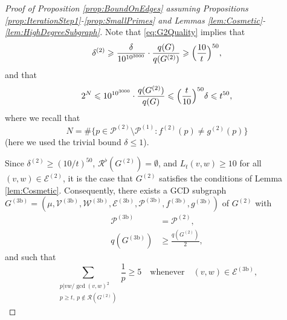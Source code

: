 \documentclass[12pt]{amsart}
\numberwithin{equation}{section}
\theoremstyle{definition}
\theoremstyle{remark}
\newcommand{\CE}{\mathcal{E}}
\newcommand{\CP}{\mathcal{P}}
\newcommand{\CR}{\mathcal{R}}
\newcommand{\CV}{\mathcal{V}}
\newcommand{\CW}{\mathcal{W}}
\newcommand{\eq}[1]{ \begin{equation} \begin{split} #1 \end{split} \end{equation} }
\renewcommand{\le}{\leqslant}
\renewcommand{\ge}{\geqslant}
\begin{document}
\begin{proof}[Proof of Proposition \ref{prop:BoundOnEdges} assuming Propositions \ref{prop:IterationStep1}-\ref{prop:SmallPrimes} and Lemmas \ref{lem:Cosmetic}-\ref{lem:HighDegreeSubgraph}]
\medskip

Note that \eqref{eq:G2Quality} implies that
\[
\delta^{(2)}\ge\frac{\delta}{10^{10^{3000}}} \cdot \frac {q(G)}{q(G^{(2)})}\ge \Bigl(\frac{10}{t}\Bigr)^{50},
\]
and that 
\eq{\label{eq:N-bound}
2^N\le 10^{10^{3000}} \cdot \frac{q(G^{(2)})}{q(G)}\le \Bigl(\frac{t}{10}\Bigr)^{50}\delta\le t^{50},
}
where we recall that 
\[
N=\#\{p\in\CP^{(2)}\setminus\CP^{(1)}:f^{(2)}(p)\ne g^{(2)}(p)\}
\] 
(here we used the trivial bound $\delta\le 1$).

Since $\delta^{(2)}\ge (10/t)^{50}$, $\CR^\flat(G^{(2)})=\emptyset$, and $L_t(v,w)\ge10$ for all $(v,w)\in\CE^{(2)}$, it is the case that $G^{(2)}$ satisfies the conditions of Lemma \ref{lem:Cosmetic}. Consequently, there exists a GCD subgraph $G^{(3\text{b})}=(\mu,\CV^{(3\text{b})},\CW^{(3\text{b})},\CE^{(3\text{b})},\CP^{(3\text{b})},f^{(3\text{b})},g^{(3\text{b})})$  of $G^{(2)}$ with 
\begin{align}
\CP^{(3\text{b})}&=\CP^{(2)},\label{eq:P3b}\\
q(G^{(3\text{b})})&\ge \frac{q(G^{(2)})}{2},
\label{eq:G3Quality}
\end{align}
and such that 
\begin{equation}
\sum_{\substack{p|v w/\gcd(v,w)^2\\p\ge t,\ p\notin \CR(G^{(2)})}}\frac{1}{p}\ge 5
\quad\text{whenever}\quad
(v,w)\in\CE^{(3\text{b})},
\label{eq:Anat1}
\end{equation}


\end{proof}
\end{document}

